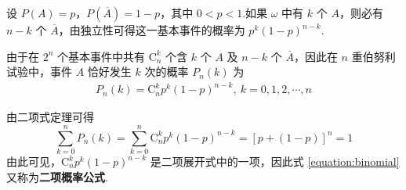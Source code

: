 设 $P(A)=p$，$P(\overline{A}) = 1-p$，其中 $0<p<1$.如果 $\omega$ 中有 $k$ 个 $A$，则必有 $n-k$ 个 $\overline{A}$，由独立性可得这一基本事件的概率为 $p^k (1-p)^{n-k}$.

由于在 $2^n$ 个基本事件中共有 $\mathrm{C}_n^k$ 个含 $k$ 个 $A$ 及 $n-k$ 个 $\overline{A}$，因此在 $n$ 重伯努利试验中，事件 $A$ 恰好发生 $k$ 次的概率 $P_n(k)$ 为
\begin{gather} \label{equation:binomial}
    P_n(k)=\mathrm{C}_n^k p^k (1-p)^{n-k}, \ k=0,1,2,\cdots,n
\end{gather}

由二项式定理可得
$$
\sum_{k=0}^n P_n(k) = \sum_{k=0}^n \mathrm{C}_n^k p^k (1-p)^{n-k} = [p+(1-p)]^n = 1
$$
由此可见，$\mathrm{C}_n^k p^k (1-p)^{n-k}$ 是二项展开式中的一项，因此式 \eqref{equation:binomial} 又称为\textbf{二项概率公式}.